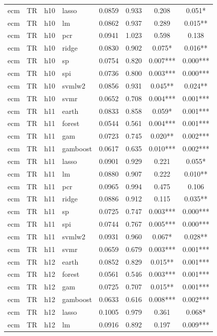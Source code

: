 \begin{ThreePartTable}
\begin{longtable}[t]{llclcccc}
ecm & TR & h10 & lasso & 0.0859 & 0.933 & 0.208 & 0.051*\\
ecm & TR & h10 & lm & 0.0862 & 0.937 & 0.289 & 0.015**\\
ecm & TR & h10 & pcr & 0.0941 & 1.023 & 0.598 & 0.138\\
ecm & TR & h10 & ridge & 0.0830 & 0.902 & 0.075* & 0.016**\\
ecm & TR & h10 & sp & 0.0754 & 0.820 & 0.007*** & 0.000***\\
ecm & TR & h10 & spi & 0.0736 & 0.800 & 0.003*** & 0.000***\\
ecm & TR & h10 & svmlw2 & 0.0856 & 0.931 & 0.045** & 0.024**\\
ecm & TR & h10 & svmr & 0.0652 & 0.708 & 0.004*** & 0.001***\\
\addlinespace
ecm & TR & h11 & earth & 0.0833 & 0.858 & 0.059* & 0.001***\\
ecm & TR & h11 & forest & 0.0544 & 0.561 & 0.004*** & 0.001***\\
ecm & TR & h11 & gam & 0.0723 & 0.745 & 0.020** & 0.002***\\
ecm & TR & h11 & gamboost & 0.0617 & 0.635 & 0.010*** & 0.002***\\
ecm & TR & h11 & lasso & 0.0901 & 0.929 & 0.221 & 0.055*\\
ecm & TR & h11 & lm & 0.0880 & 0.907 & 0.222 & 0.010**\\
ecm & TR & h11 & pcr & 0.0965 & 0.994 & 0.475 & 0.106\\
ecm & TR & h11 & ridge & 0.0886 & 0.912 & 0.115 & 0.035**\\
ecm & TR & h11 & sp & 0.0725 & 0.747 & 0.003*** & 0.000***\\
ecm & TR & h11 & spi & 0.0744 & 0.767 & 0.005*** & 0.000***\\
ecm & TR & h11 & svmlw2 & 0.0931 & 0.960 & 0.067* & 0.028**\\
ecm & TR & h11 & svmr & 0.0659 & 0.679 & 0.003*** & 0.001***\\
\addlinespace
ecm & TR & h12 & earth & 0.0852 & 0.829 & 0.015** & 0.001***\\
ecm & TR & h12 & forest & 0.0561 & 0.546 & 0.003*** & 0.001***\\
ecm & TR & h12 & gam & 0.0725 & 0.707 & 0.015** & 0.001***\\
ecm & TR & h12 & gamboost & 0.0633 & 0.616 & 0.008*** & 0.002***\\
ecm & TR & h12 & lasso & 0.1005 & 0.979 & 0.361 & 0.068*\\
ecm & TR & h12 & lm & 0.0916 & 0.892 & 0.197 & 0.009***\\

\end{longtable}
\end{ThreePartTable}
